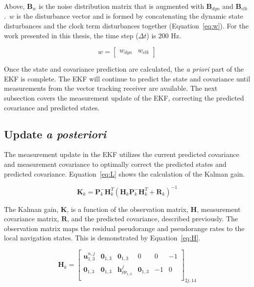 Above, \(\mathbf{B}_w\) is the noise distribution matrix that is augmented with \(\mathbf{B}_{dyn}\) and \(\mathbf{B}_{clk}\).~\(w\) is the disturbance vector and is formed by concatenating the dynamic state disturbances and the clock term disturbances together (Equation~\ref{eq:w}). For the work presented in this thesis, the time step (\(\Delta t\)) is \(200\) Hz.

\begin{equation}\label{eq:w}
    w = \begin{bmatrix}
        w_{dyn} & w_{clk}
    \end{bmatrix}
\end{equation}

Once the state and covariance prediction are calculated, the \textit{a priori} part of the EKF is complete. The EKF will continue to predict the state and covariance until measurements from the vector tracking receiver are available. The next subsection covers the measurement update of the EKF, correcting the predicted covariance and predicted states.

\subsection{\textbf{Update \textit{a posteriori}}}
The measurement update in the EKF utilizes the current predicted covariance and measurement covariance to optimally correct the predicted states and predicted covariance. Equation~\ref{eq:L} shows the calculation of the Kalman gain.

\begin{equation}\label{eq:L}
    \mathbf{K}_k = \mathbf{P}^-_k \mathbf{H}^T_k{\left(\mathbf{H}_k\mathbf{P}^-_k\mathbf{H}^T_k + \mathbf{R}_k\right)}^{-1}
\end{equation}

The Kalman gain, \(\mathbf{K}\), is a function of the observation matrix, \(\mathbf{H}\), measurement covariance matrix, \(\mathbf{R}\), and the predicted covariance, described previously. The observation matrix maps the residual pseudorange and pseudorange rates to the local navigation states. This is demonstrated by Equation~\ref{eq:H}.

\begin{equation}\label{eq:H}
    \mathbf{H}_k = \begin{bmatrix}
        \mathbf{u}^{n,j}_{1,3} & \mathbf{0}_{1,3} & \mathbf{0}_{1,3}            & 0                & 0  & -1 \\
        \mathbf{0}_{1,3}       & \mathbf{0}_{1,3} & \mathbf{h}^j_{\rho p_{1,3}} & \mathbf{0}_{1,3} & -1 & 0  \\
    \end{bmatrix}_{2j,14}
\end{equation}

